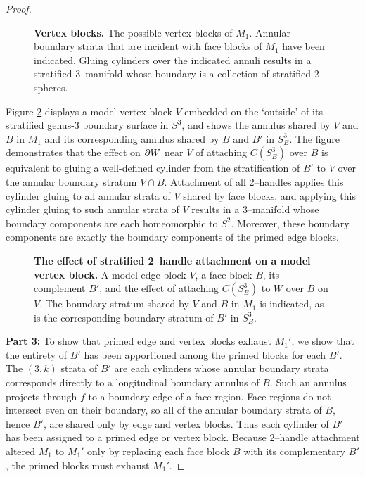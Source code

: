 \begin{proof}
	\begin{figure}[h!]
		\caption{
			\textbf{Vertex blocks.}
			The possible vertex blocks of $M_1$.
			Annular boundary strata that are incident with face blocks of $M_1$ have been indicated.
			Gluing cylinders over the indicated annuli results in a stratified 3--manifold whose boundary is a collection of stratified 2--spheres.
		}
		\label{fig:vertex-block-incidence}
	\end{figure}	
	
	Figure \ref{fig:vertex-face-shared-boundary} displays a model vertex block $V$ embedded on the `outside' of its stratified genus-3 boundary surface in $S^3$, and shows the annulus shared by $V$ and $B$ in $M_1$ and its corresponding annulus shared by $B$ and $B'$ in $S_B^3$.
	The figure demonstrates that the effect on $\partial W$ near $V$ of attaching $C(S_B^3)$ over $B$ is equivalent to gluing a well-defined cylinder from the stratification of $B'$  to $V$ over the annular boundary stratum $V\cap B$.
	Attachment of all 2--handles applies this cylinder gluing to all annular strata of $V$ shared by face blocks, and applying this cylinder gluing to such annular strata of $V$ results in a 3--manifold whose boundary components are each homeomorphic to $S^2$.
	Moreover, these boundary components are exactly the boundary components of the primed edge blocks.
	
	\begin{figure}[h!]
		\caption{
			\textbf{The effect of stratified 2--handle attachment on a model vertex block.}
			A model edge block $V$, a face block $B$, its complement $B'$, and the effect of attaching $C(S_B^3)$ to $W$ over $B$ on $V$.
			The boundary stratum shared by $V$ and $B$ in $M_1$ is indicated, as is the corresponding boundary stratum of $B'$ in $S_B^3$.
		}
		\label{fig:vertex-face-shared-boundary}
	\end{figure}

	\textbf{Part 3:}
	To show that primed edge and vertex blocks exhaust $M_1'$, we show that the entirety of $B'$ has been apportioned among the primed blocks for each $B'$.
	The $(3,k)$ strata of $B'$ are each cylinders whose annular boundary strata corresponds directly to a longitudinal boundary annulus of $B$.
	Such an annulus projects through $f$ to a boundary edge of a face region.
	Face regions do not intersect even on their boundary, so all of the annular boundary strata of $B$, hence $B'$, are shared only by edge and vertex blocks.
	Thus each cylinder of $B'$ has been assigned to a primed edge or vertex block.
	Because 2--handle attachment altered $M_1$ to $M_1'$ only by replacing each face block $B$ with its complementary $B'$, the primed blocks must exhaust $M_1'$.
\end{proof}

